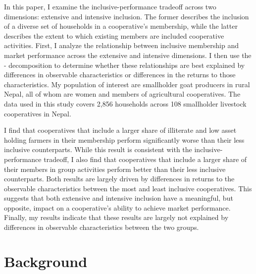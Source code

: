 \documentclass[11pt]{article}
\begin{document}
In this paper, I examine the inclusive-performance tradeoff across two dimensions: extensive and intensive inclusion. The former describes the inclusion of a diverse set of households in a cooperative's membership, while the latter describes the extent to which existing members are included cooperative activities. First, I analyze the relationship between inclusive membership and market performance across the extensive and intensive dimensions. I then use the \citet{oaxaca_male-female_1973}-\citet{blinder_wage_1973} decomposition to determine whether these relationships are best explained by differences in observable characteristics or differences in the returns to those characteristics. My population of interest are smallholder goat producers in rural Nepal, all of whom are women and members of agricultural cooperatives. The data used in this study covers 2,856 households across 108 smallholder livestock cooperatives in Nepal. 

I find that cooperatives that include a larger share of illiterate and low asset holding farmers in their membership perform significantly worse than their less inclusive counterparts. While this result is consistent with the inclusive-performance tradeoff, I also find that cooperatives that include a larger share of their members in group activities perform better than their less inclusive counterparts. Both results are largely driven by differences in returns to the observable characteristics between the most and least inclusive cooperatives. This suggests that both extensive and intensive inclusion have a meaningful, but opposite, impact on a cooperative's ability to achieve market performance. Finally, my results indicate that these results are largely not explained by differences in observable characteristics between the two groups. %


\section{Background} \label{sec:background}
\end{document}
